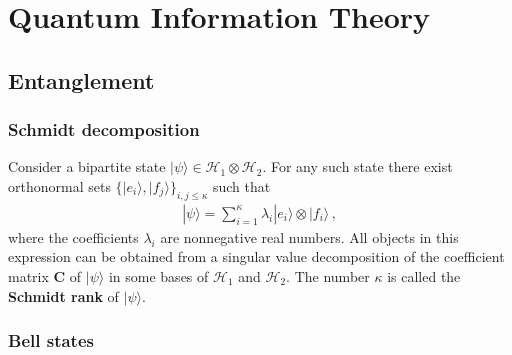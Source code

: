 \chapter{Quantum Information Theory}\label{chapter:quantum_computing}

\section{Entanglement}
\subsection{Schmidt decomposition}

    \begin{construct}
        Consider a bipartite state $|\psi\rangle\in\mathcal{H}_1\otimes\mathcal{H}_2$. For any such state there exist orthonormal sets $\big\{|e_i\rangle, |f_j\rangle\big\}_{i,j\leq\kappa}$ such that
        \begin{gather}
            |\psi\rangle = \sum_{i=1}^\kappa\lambda_i|e_i\rangle\otimes|f_i\rangle\,,
        \end{gather}
        where the coefficients $\lambda_i$ are nonnegative real numbers. All objects in this expression can be obtained from a singular value decomposition of the coefficient matrix $\mathbf{C}$ of $|\psi\rangle$ in some bases of $\mathcal{H}_1$ and $\mathcal{H}_2$. The number $\kappa$ is called the \textbf{Schmidt rank} of $|\psi\rangle$.
    \end{construct}


\subsection{Bell states}


